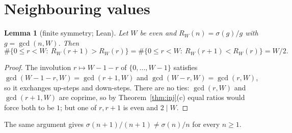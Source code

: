 \documentclass[11pt]{amsart}
\newtheorem{lemma}[theorem]{Lemma}
\theoremstyle{remark}
\newcommand{\s}{\sigma}
\begin{document}
\section{Neighbouring values}

\begin{lemma}[finite symmetry; Lean]\label{lem:finite}
Let $W$ be even and $R_W(n)=\s(g)/g$ with $g=\gcd(n,W)$. Then
\[
\#\{0\le r<W:\ R_W(r+1)>R_W(r)\}=\#\{0\le r<W:\ R_W(r+1)<R_W(r)\}=W/2 .
\]
\end{lemma}
\begin{proof}
The involution $r\mapsto W-1-r$ of $\{0,\dots,W-1\}$ satisfies $\gcd(W-1-r,W)=\gcd(r+1,W)$ and $\gcd(W-r,W)=\gcd(r,W)$, so it exchanges up-steps and down-steps. There are no ties: $\gcd(r,W)$ and $\gcd(r+1,W)$ are coprime, so by Theorem~\ref{thm:inj}(c) equal ratios would force both to be $1$; but one of $r,r+1$ is even and $2\mid W$.
\end{proof}

The same argument gives $\s(n+1)/(n+1)\neq\s(n)/n$ for every $n\ge1$.
\end{document}
